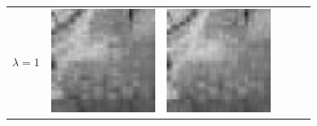 \documentclass[11pt,a4paper,openright,oneside]{book}
\numberwithin{equation}{section}
\begin{document}
{\begin{figure}[h]
\begin{adjustwidth}{-3cm}{-3cm}
\begin{tabular}{>{\centering\arraybackslash}m{1.5cm} m{2.5cm} m{2.5cm} m{2.5cm} m{2.5cm} m{2.5cm}}
        $\lambda = 1$ &
        \includegraphics[width=\linewidth]{media/tnale/AAAfruits-comp1-ale-1.png} &
        \includegraphics[width=\linewidth]{media/tnale/AAAfruits-comp2-ale-1.png} &

\end{tabular}
\end{adjustwidth}
\end{figure}}
\end{document}

